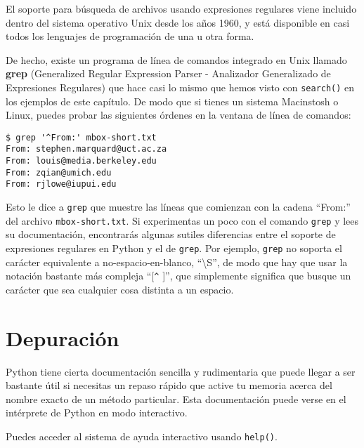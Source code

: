 El soporte para búsqueda de archivos usando expresiones regulares viene incluido dentro del sistema operativo Unix
desde los años 1960, y está disponible en casi todos los lenguajes de programación de una u otra forma.

De hecho, existe un programa de línea de comandos integrado en Unix
llamado {\bf grep} (Generalized Regular Expression Parser - Analizador Generalizado de Expresiones Regulares) que
hace casi lo mismo que hemos visto con {\tt search()} en los ejemplos de este capítulo. De modo que si tienes un
sistema Macinstosh o Linux, puedes probar las siguientes órdenes en la ventana de línea de comandos:

\beforeverb
\begin{verbatim}
$ grep '^From:' mbox-short.txt
From: stephen.marquard@uct.ac.za
From: louis@media.berkeley.edu
From: zqian@umich.edu
From: rjlowe@iupui.edu
\end{verbatim}
\afterverb
%
Esto le dice a {\tt grep} que muestre las líneas que comienzan con la cadena ``From:'' del archivo
{\tt mbox-short.txt}. Si experimentas un poco con el comando {\tt grep} y lees su documentación,
encontrarás algunas sutiles diferencias entre el soporte de expresiones regulares en Python y el
de {\tt grep}. Por ejemplo, {\tt grep} no soporta el carácter equivalente a no-espacio-en-blanco,
``{\textbackslash}S'', de modo que hay que usar la notación bastante más compleja ``[\verb"^" ]'',
que simplemente significa que busque un carácter que sea cualquier cosa distinta a un espacio.

\section{Depuración}

Python tiene cierta documentación sencilla y rudimentaria que puede llegar a ser bastante útil si
necesitas un repaso rápido que active tu memoria acerca del nombre exacto de un método particular.
Esta documentación puede verse en el intérprete de Python en modo interactivo.

Puedes acceder al sistema de ayuda interactivo usando {\tt help()}.

